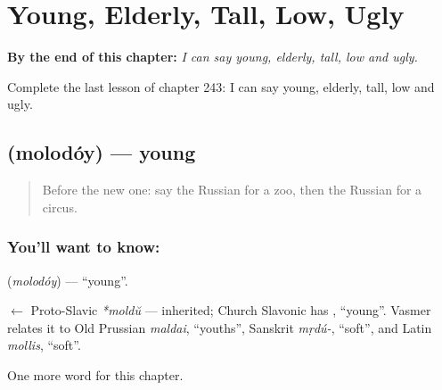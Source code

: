 
\chapter{Young, Elderly, Tall, Low, Ugly}
\label{ch:ru-young-elderly-tall-low-ugly}

\begin{chapteropening}
\textbf{By the end of this chapter:} \emph{I can say young, elderly, tall, low and ugly.}

Complete the last lesson of chapter 243: I can say young, elderly, tall, low and ugly.
\end{chapteropening}

\section[\texorpdfstring{\ru{молодой} (molodóy)}{молодой (molodóy)}]{ (molodóy) — young}

\label{lesson:RU-C243-molodoy}



\begin{quote}
Before the new one: say the Russian for a zoo, then the Russian for a circus.
\end{quote}

\subsection*{You'll want to know: }
\textbf{} (\emph{molodóy}) — \textquotedblleft{}young\textquotedblright{}.

\begin{cousinweb}
\textbf{} $\leftarrow$ Proto-Slavic \emph{*moldŭ} — inherited; Church Slavonic has \emph{}, \textquotedblleft{}young\textquotedblright{}. Vasmer relates it to Old Prussian \emph{maldai}, \textquotedblleft{}youths\textquotedblright{}, Sanskrit \emph{mṛdú-}, \textquotedblleft{}soft\textquotedblright{}, and Latin \emph{mollis}, \textquotedblleft{}soft\textquotedblright{}.
\end{cousinweb}

\begin{grammarlens}[title={What you've built}]
One more word for this chapter.
\end{grammarlens}

